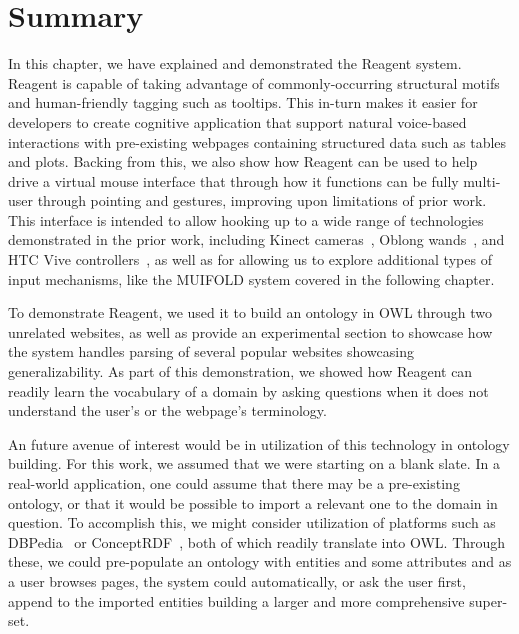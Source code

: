 \section{Summary}

In this chapter, we have explained and demonstrated the Reagent system. Reagent
is capable of taking advantage of commonly-occurring structural motifs and
human-friendly tagging such as tooltips. This in-turn makes it easier for
developers to create cognitive application that support natural voice-based
interactions with pre-existing webpages containing structured data such as tables
and plots. Backing from this, we also show how Reagent can be used to help
drive a virtual mouse interface that through how it functions can be fully multi-user
through pointing and gestures, improving upon limitations of prior work. This interface
is intended to allow hooking up to a wide range of technologies demonstrated in
the prior work, including Kinect cameras~\cite{allen_rensselaer_2019},
Oblong wands~\cite{kephart_embodied_2019}, and HTC Vive controllers~\cite{zhao_immersive_2018},
as well as for allowing us to explore additional types of input mechanisms, like the
MUIFOLD system covered in the following chapter.

To demonstrate Reagent, we used it to build an ontology in OWL through two unrelated websites,
as well as provide an experimental section to showcase how the system handles
parsing of several popular websites showcasing generalizability. As part of this demonstration,
we showed how Reagent can readily learn the vocabulary of a domain by asking questions when it
does not understand the user's or the webpage's terminology.

An future avenue of interest would be in utilization of this technology in ontology building.
For this work, we assumed that we were starting on a blank slate. In a real-world application,
one could assume that there may be a pre-existing ontology, or that it would be possible to
import a relevant one to the domain in question. To accomplish this, we might consider utilization
of platforms such as DBPedia~\cite{auer2007} or ConceptRDF~\cite{najmi_conceptrdf:_2016}, both
of which readily translate into OWL. Through these, we could pre-populate an ontology with
entities and some attributes and as a user browses pages, the system could automatically, or
ask the user first, append to the imported entities building a larger and more comprehensive super-set.